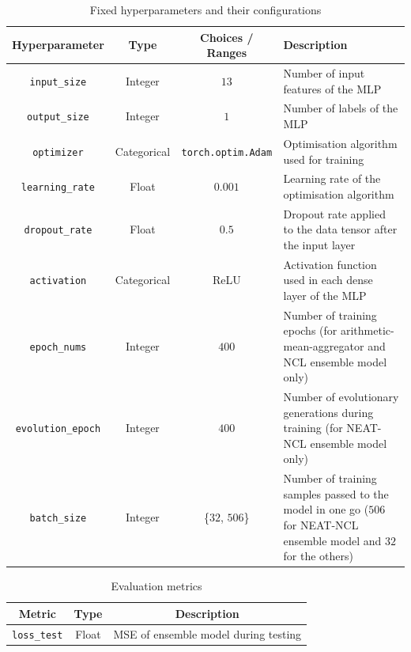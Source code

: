 \begin{table}[H]
    \centering
    \begin{tabular}{|c|c|c|p{5cm}|}
        \hline
        Hyperparameter & Type & Choices / Ranges & Description \\
        \hline
        \small\texttt{input\_size} & Integer & $13$ & Number of input features of the MLP \\
        \hline
        \small\texttt{output\_size} & Integer & $1$ & Number of labels of the MLP \\
        \hline
        \small\texttt{optimizer} & Categorical & \texttt{torch.optim.Adam} & Optimisation algorithm used for training \\
        \hline
        \small\texttt{learning\_rate} & Float & $0.001$ & Learning rate of the optimisation algorithm \\
        \hline
        \small\texttt{dropout\_rate} & Float & $0.5$ & Dropout rate applied to the data tensor after the input layer \\
        \hline
        \small\texttt{activation} & Categorical & ReLU & Activation function used in each dense layer of the MLP \\
        \hline
        \small\texttt{epoch\_nums} & Integer & $400$ & Number of training epochs (for arithmetic-mean-aggregator and NCL ensemble model only) \\
        \hline
        \small\texttt{evolution\_epoch} & Integer & $400$ & Number of evolutionary generations during training (for NEAT-NCL ensemble model only) \\
        \hline
        \small\texttt{batch\_size} & Integer & \{$32$, $506$\} & Number of training samples passed to the model in one go ($506$ for NEAT-NCL ensemble model and $32$ for the others) \\
        \hline
    \end{tabular}
    \caption{Fixed hyperparameters and their configurations}
    \label{table:experiment_5_fixed_hyperparameters}
\end{table}

\begin{table}[H]
    \centering
    \begin{tabular}{|c|c|c|}
        \hline
        Metric & Type & Description \\
        \hline
        \small\texttt{loss\_test} & Float & MSE of ensemble model during testing \\
        \hline
    \end{tabular}
    \caption{Evaluation metrics}
    \label{table:experiment_5_metric}
\end{table}



